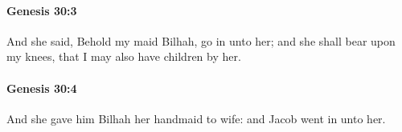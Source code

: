 		\paragraph{Genesis 30:3} %
			\label{GENESIS-30-3}

			And she said, Behold my maid Bilhah, go in unto her; and she shall bear upon my knees, that I may also have children by her.


		\paragraph{Genesis 30:4} %
			\label{GENESIS-30-4}

			And she gave him Bilhah her handmaid to wife: and Jacob went in unto her.


